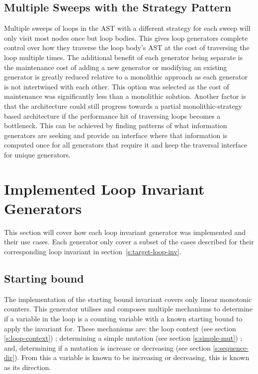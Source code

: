 
\subsection{Multiple Sweeps with the Strategy Pattern}

Multiple sweeps of loops in the AST with a different strategy for each sweep
will only visit most nodes once but loop bodies.
This gives loop generators complete control over how they traverse the loop
body's AST at the cost of traversing the loop multiple times.
The additional benefit of each generator being separate is the maintenance cost
of adding a new generator or modifying an existing generator is greatly reduced
relative to a monolithic approach as each generator is not intertwined with
each other.
This option was selected as the cost of maintenance was significantly less
than a monolithic solution.
Another factor is that the architecture could still progress towards
a partial monolithic-strategy based architecture if the performance hit
of traversing loops becomes a bottleneck.
This can be achieved by finding patterns of what information generators are
seeking and provide an interface where that information is computed once for
all generators that require it and keep the traversal interface for unique generators.

\section{Implemented Loop Invariant Generators}

This section will cover how each loop invariant generator was implemented and their use cases.
Each generator only cover a subset of the cases described 
for their corresponding loop invariant in section~\ref{s:target-loop-inv}.

\subsection{Starting bound}

The implementation of the starting bound invariant covers only linear monotonic counters.
This generator utilises and composes multiple mechanisms to determine 
if a variable in the
loop is a counting variable with a known starting bound to apply the invariant for.
These mechanisms are: the loop context (see section \ref{s:loop-context}) ;
determining a simple mutation (see section \ref{s:simple-mut}) ; and,
determining if a mutation is increase or decreasing (see section \ref{s:sequence-dir}).
From this a variable is known to be increasing or decreasing, this is known as its direction.

